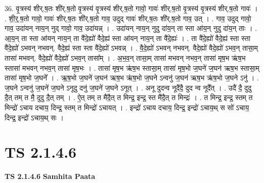\documentclass[17pt]{extarticle}
\begin{document}
36. वृ॒त्रस्य॑ शीर्.ष॒तः शी॑र्.ष॒तो वृ॒त्रस्य॑ वृ॒त्रस्य॑ शीर्.ष॒तो गावो॒ गावः॑ शीर्.ष॒तो वृ॒त्रस्य॑ वृ॒त्रस्य॑ शीर्.ष॒तो गावः॑ । . शी॒र्॒.ष॒तो गावो॒ गावः॑ शीर्.ष॒तः शी॑र्.ष॒तो गाव॒ उदुद् गावः॑ शीर्.ष॒तः शी॑र्.ष॒तो गाव॒ उत् । . गाव॒ उदुद् गावो॒ गाव॒ उदा॑यन् नाय॒न् नुद् गावो॒ गाव॒ उदा॑यन्न् । . उदा॑यन् नाय॒न् नुदु दा॑य॒न् ता स्ता आ॑य॒न् नुदु दा॑य॒न् ताः । . आ॒य॒न् ता स्ता आ॑यन् नाय॒न् ता वै॑दे॒ह्यो॑ वैदे॒ह्य॑ स्ता आ॑यन् नाय॒न् ता वै॑दे॒ह्यः॑ । . ता वै॑दे॒ह्यो॑ वैदे॒ह्य॑ स्ता स्ता वै॑दे॒ह्यो॑ ऽभवन् नभवन्. वैदे॒ह्य॑ स्ता स्ता वै॑दे॒ह्यो॑ ऽभवन्न् । . वै॒दे॒ह्यो॑ ऽभवन् नभवन्. वैदे॒ह्यो॑ वैदे॒ह्यो॑ ऽभव॒न् तासा॒म् तासा॑ मभवन्. वैदे॒ह्यो॑ वैदे॒ह्यो॑ ऽभव॒न् तासा᳚म् । . अ॒भ॒व॒न् तासा॒म् तासा॑ मभवन् नभव॒न् तासा॑ मृष॒भ ऋ॑ष॒भ स्तासा॑ मभवन् नभव॒न् तासा॑ मृष॒भः । . तासा॑ मृष॒भ ऋ॑ष॒भ स्तासा॒म् तासा॑ मृष॒भो ज॒घने॑ ज॒घन॑ ऋष॒भ स्तासा॒म् तासा॑ मृष॒भो ज॒घने᳚ । . ऋ॒ष॒भो ज॒घने॑ ज॒घन॑ ऋष॒भ ऋ॑ष॒भो ज॒घने ऽन्वनु॑ ज॒घन॑ ऋष॒भ ऋ॑ष॒भो ज॒घने ऽनु॑ । . ज॒घने ऽन्वनु॑ ज॒घने॑ ज॒घने ऽनूदु दनु॑ ज॒घने॑ ज॒घने ऽनूत् । . अनू दुदन्व नूदै॑दै॒ दुद न्व नूदै᳚त् । . उदै॑ दै॒ दुदु दै॒त् तम् त मै॒ दुदु दै॒त् तम् । . ऐ॒त् तम् त मै॑दै॒त् त मिन्द्र॒ इन्द्र॒ स्त मै॑दै॒त् त मिन्द्रः॑ । . त मिन्द्र॒ इन्द्र॒ स्तम् त मिन्द्रो॑ ऽचाय दचाय॒ दिन्द्र॒ स्तम् त मिन्द्रो॑ ऽचायत् । . इन्द्रो॑ ऽचाय दचाय॒ दिन्द्र॒ इन्द्रो॑ ऽचाय॒थ् स सो॑ ऽचाय॒ दिन्द्र॒ इन्द्रो॑ ऽचाय॒थ् सः । \newline
\pagebreak
{}
\section*{ TS 2.1.4.6 }

\textbf{TS 2.1.4.6 } \newline
\textbf{Samhita Paata} \newline
\end{document}

